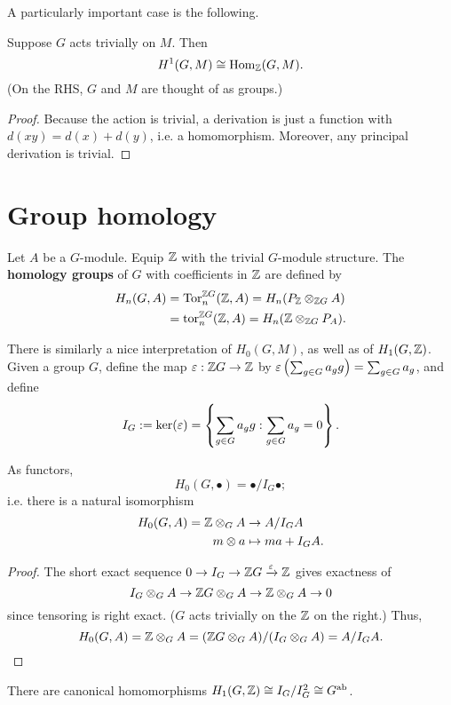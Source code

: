 A particularly important case is the following.
\begin{cor}
Suppose $G$ acts trivially on $M$. Then
\[
H^1(G,M)\cong \operatorname{Hom}_{\mathbb{Z}}(G,M).
\]
(On the RHS, $G$ and $M$ are thought of as groups.)
\end{cor}
\begin{proof}
Because the action is trivial, a derivation is just a function with $d(xy)=d(x)+d(y)$, i.e. a homomorphism. Moreover, any principal derivation is trivial.
\end{proof}
\section{Group homology}
\begin{df}
Let $A$ be a $G$-module. 
Equip $\mathbb{Z}$ with the trivial $G$-module structure.
The \textbf{homology groups} of $G$ with coefficients in $\mathbb{Z}$ are defined by
\begin{align*}
H_n(G,A)&=\operatorname{Tor}_n^{\mathbb{Z} G}(\mathbb{Z}, A)=H_n(P_{\mathbb{Z}}\otimes_{\mathbb{Z} G} A)\\
&=\operatorname{tor}_n^{\mathbb{Z} G}(\mathbb{Z}, A)=H_n(\mathbb{Z}\otimes_{\mathbb{Z} G} P_A).
\end{align*}
\end{df}
There is similarly a nice interpretation of $H_0(G,M)$, as well as of $H_1(G,\mathbb{Z})$. Given a group $G$, define the map $\varepsilon:\mathbb{Z} G\to \mathbb{Z}$ by $\varepsilon\left( {\sum_{g\in G} a_gg} \right)=\sum_{g\in G}a_g$, and define
\[
 I_G:=\ker(\varepsilon)=\left\{{\sum_{g\in G} a_gg}:{\sum_{g\in G}a_g=0}\right\}.
\]
\begin{pr}
As functors,
\[
H_0(G,\bullet)=\bullet/ I_G\bullet;
\]
i.e. there is a natural isomorphism
\begin{align*}
H_0(G,A)=\mathbb{Z}\otimes_G A&\to A/ I_G A\\
m\otimes a &\mapsto ma+ I_G A.
\end{align*}
\end{pr}
\begin{proof}
The short exact sequence $0\to I_G\to \mathbb{Z} G\xrightarrow{\varepsilon} \mathbb{Z}$ gives exactness of
\[
I_G\otimes_G A \to \mathbb{Z} G\otimes_G A\to \mathbb{Z}\otimes_G A\to 0
\]
since tensoring is right exact. ($G$ acts trivially on the $\mathbb{Z}$ on the right.) Thus,
\[
H_0(G,A)=\mathbb{Z} \otimes_G A=(\mathbb{Z} G\otimes_G A)/(I_G\otimes_G A)=A/I_GA.
\]
\end{proof}
\begin{pr}
There are canonical homomorphisms $H_1(G,\mathbb{Z})\cong I_G/I_G^2\cong G^{\text{ab}}$.
\end{pr}
